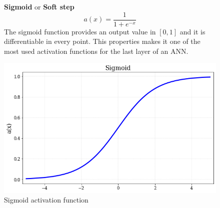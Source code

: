 \begin{figure}[!h]

\begin{minipage}{0.5\textwidth}
    \textbf{Sigmoid} or \textbf{Soft step}
   \begin{equation}
       a(x) =\frac{1}{1+e^{-x}}
   \end{equation}
   The sigmoid function provides an output value in $[0,1]$ and it is differentiable in every point. This properties makes it one of the most used activation functions for the last layer of an ANN.
\end{minipage}
\hfill
\begin{minipage}{0.45\textwidth}

    \centering
\includegraphics[width=\textwidth]{sections/03/Images/Sigmoid.png}
\caption{Sigmoid activation function}
    \label{fig:act_sig}
\end{minipage}
\end{figure}  


